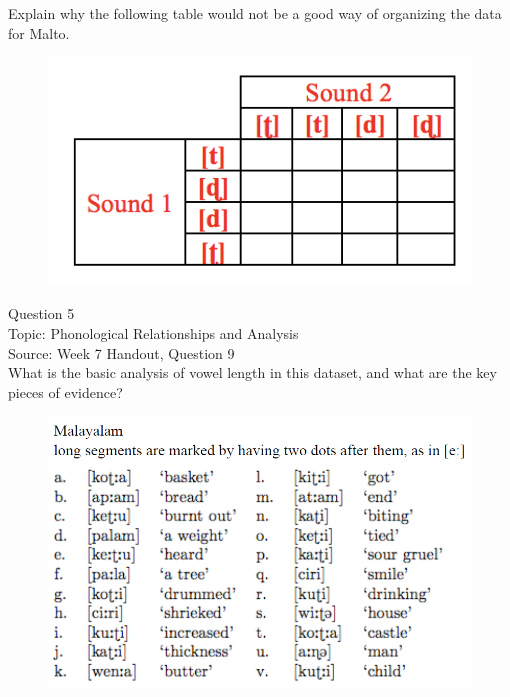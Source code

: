 \documentclass[12pt]{article}
\begin{document}
Explain why the following table would not be a good way of organizing the data for Malto.\\

\begin{figure}[H]
\includegraphics{../images/Malto_table_bad.png}
\end{figure}

\newpage

{\large Question 5}\\

Topic: Phonological Relationships and Analysis\\
Source: Week 7 Handout, Question 9\\

What is the basic analysis of vowel length in this dataset, and what are the key pieces of evidence?\\

\begin{figure}[H]
\includegraphics{../images/malayalam.png}
\end{figure}

\newpage
\end{document}
